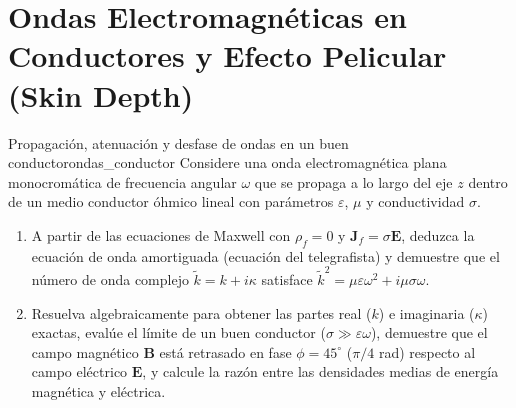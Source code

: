 \documentclass[11pt,a4paper]{book}
\newcommand{\Evec}{\bm{E}}
\newcommand{\Bvec}{\bm{B}}
\newcommand{\Jvec}{\bm{J}}
\begin{document}
\section{Ondas Electromagnéticas en Conductores y Efecto Pelicular (Skin Depth)}

\begin{ejercicio}{Propagación, atenuación y desfase de ondas en un buen conductor}{ondas_conductor}
Considere una onda electromagnética plana monocromática de frecuencia angular $\omega$ que se propaga a lo largo del eje $z$ dentro de un medio conductor óhmico lineal con parámetros $\varepsilon$, $\mu$ y conductividad $\sigma$.
\begin{enumerate}[label=\alph*)]
    \item A partir de las ecuaciones de Maxwell con $\rho_f = 0$ y $\Jvec_f = \sigma\Evec$, deduzca la ecuación de onda amortiguada (ecuación del telegrafista) y demuestre que el número de onda complejo $\tilde{k} = k + i\kappa$ satisface $\tilde{k}^2 = \mu\varepsilon\omega^2 + i\mu\sigma\omega$.
    \item Resuelva algebraicamente para obtener las partes real ($k$) e imaginaria ($\kappa$) exactas, evalúe el límite de un buen conductor ($\sigma \gg \varepsilon\omega$), demuestre que el campo magnético $\Bvec$ está retrasado en fase $\phi = 45^\circ$ ($\pi/4$ rad) respecto al campo eléctrico $\Evec$, y calcule la razón entre las densidades medias de energía magnética y eléctrica.
\end{enumerate}
\end{ejercicio}
\end{document}
